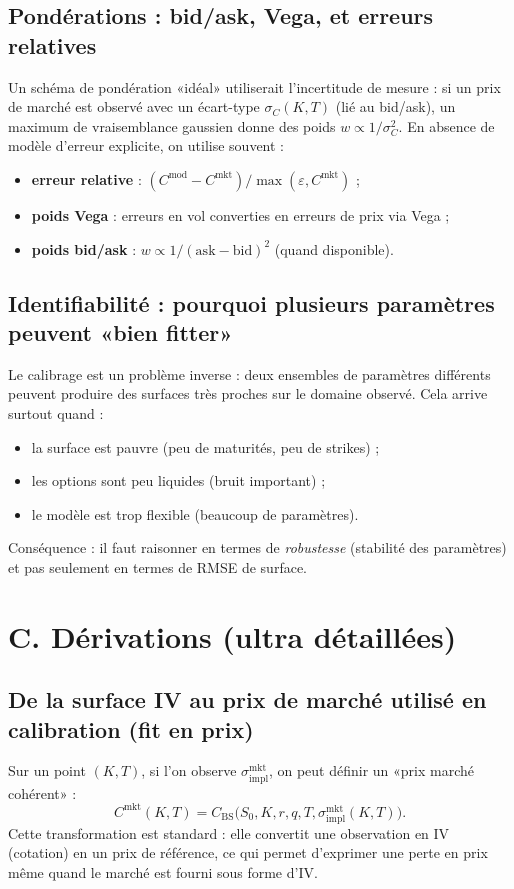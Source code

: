 \documentclass[11pt,a4paper]{report}
\theoremstyle{definition}
\theoremstyle{plain}
\theoremstyle{remark}
\newcommand{\1}{\mathbf{1}}
\begin{document}
\subsection*{Pondérations : bid/ask, Vega, et erreurs relatives}
Un schéma de pondération «idéal» utiliserait l'incertitude de mesure : si un prix de marché est observé avec un écart-type $\sigma_C(K,T)$ (lié au bid/ask), un maximum de vraisemblance gaussien donne des poids $w\propto 1/\sigma_C^2$.
En absence de modèle d'erreur explicite, on utilise souvent :
\begin{itemize}[leftmargin=*]
\item \textbf{erreur relative} : $(C^{\text{mod}}-C^{\text{mkt}})/\max(\varepsilon,C^{\text{mkt}})$ ;
\item \textbf{poids Vega} : erreurs en vol converties en erreurs de prix via Vega ;
\item \textbf{poids bid/ask} : $w\propto 1/(\mathrm{ask}-\mathrm{bid})^2$ (quand disponible).
\end{itemize}

\subsection*{Identifiabilité : pourquoi plusieurs paramètres peuvent «bien fitter»}
Le calibrage est un problème inverse : deux ensembles de paramètres différents peuvent produire des surfaces très proches sur le domaine observé.
Cela arrive surtout quand :
\begin{itemize}[leftmargin=*]
\item la surface est pauvre (peu de maturités, peu de strikes) ;
\item les options sont peu liquides (bruit important) ;
\item le modèle est trop flexible (beaucoup de paramètres).
\end{itemize}
Conséquence : il faut raisonner en termes de \emph{robustesse} (stabilité des paramètres) et pas seulement en termes de RMSE de surface.



\section{C. Dérivations (ultra détaillées)}
\subsection*{De la surface IV au prix de marché utilisé en calibration (fit en prix)}
Sur un point $(K,T)$, si l'on observe $\sigma_{\text{impl}}^{\text{mkt}}$, on peut définir un «prix marché cohérent» :
\[
C^{\text{mkt}}(K,T)=C_{\text{BS}}\big(S_0,K,r,q,T,\sigma_{\text{impl}}^{\text{mkt}}(K,T)\big).
\]
Cette transformation est standard : elle convertit une observation en IV (cotation) en un prix de référence, ce qui permet d'exprimer une perte en prix même quand le marché est fourni sous forme d'IV.
\end{document}
